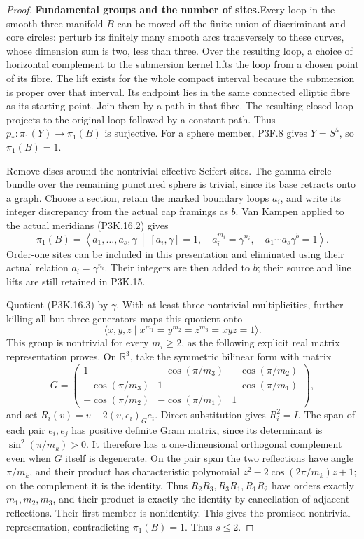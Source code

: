 \begin{proof}
\par\medskip\noindent\textbf{Fundamental groups and the number of sites.}\enspace Every
loop in the smooth three-manifold \(B\) can be moved off the
finite union of discriminant and core circles: perturb its
finitely many smooth arcs transversely to these curves, whose
dimension sum is two, less than three.  Over the resulting
loop, a choice of horizontal complement to the submersion
kernel lifts the loop from a chosen point of its fibre.  The
lift exists for the whole compact interval because the
submersion is proper over that interval.  Its endpoint lies
in the same connected elliptic fibre as its starting point.
Join them by a path in that fibre.  The resulting closed loop
projects to the original loop followed by a constant path.
Thus \(p_*:\pi_1(Y)\to\pi_1(B)\) is surjective.
For a sphere member, P3F.8 gives \(Y=S^5\), so
\(\pi_1(B)=1\).

Remove discs around the nontrivial effective Seifert sites.
The gamma-circle bundle over the remaining punctured sphere
is trivial, since its base retracts onto a graph.  Choose a
section, retain the marked boundary loops \(a_i\), and write
its integer discrepancy from the actual cap framings as \(b\).
Van Kampen applied to the actual meridians (P3K.16.2) gives
\[
 \pi_1(B)=\left\langle a_1,\ldots,a_s,\gamma\ \middle|\
 [a_i,\gamma]=1,\quad a_i^{m_i}=\gamma^{n_i},\quad
                 a_1\cdots a_s\gamma^b=1\right\rangle.
                                                        \tag{P3K.16.3}
\]
Order-one sites can be included in this presentation and
eliminated using their actual relation \(a_i=\gamma^{n_i}\).
Their integers are then added to \(b\); their source and
line lifts are still retained in P3K.15.

Quotient (P3K.16.3) by \(\gamma\).  With at least three
nontrivial multiplicities, further killing all but three
generators maps this quotient onto
\[
       \langle x,y,z\mid x^{m_1}=y^{m_2}=z^{m_3}=xyz=1\rangle.
\]
This group is nontrivial for every \(m_i\ge2\), as the
following explicit real matrix representation proves.  On
\(\mathbb R^3\), take the symmetric bilinear form with matrix
\[
 G=\begin{pmatrix}
 1&-\cos(\pi/m_3)&-\cos(\pi/m_2)\\
 -\cos(\pi/m_3)&1&-\cos(\pi/m_1)\\
 -\cos(\pi/m_2)&-\cos(\pi/m_1)&1
 \end{pmatrix},
\]
and set \(R_i(v)=v-2(v,e_i)_G e_i\).  Direct substitution
gives \(R_i^2=I\).  The span of each pair \(e_i,e_j\)
has positive definite Gram matrix, since its determinant is
\(\sin^2(\pi/m_k)>0\).  It therefore has a one-dimensional
orthogonal complement even when \(G\) itself is degenerate.
On the pair span the two reflections have angle \(\pi/m_k\),
and their product has characteristic polynomial
\(z^2-2\cos(2\pi/m_k)z+1\); on the complement it is
the identity.  Thus \(R_2R_3,R_3R_1,R_1R_2\) have
orders exactly \(m_1,m_2,m_3\), and their product is
exactly the identity by cancellation of adjacent reflections.
Their first member is nonidentity.  This gives the promised
nontrivial representation, contradicting
\(\pi_1(B)=1\).  Thus \(s\le2\).


\end{proof}
